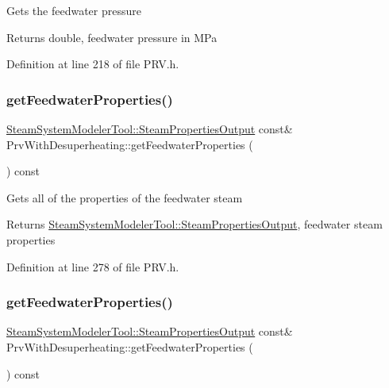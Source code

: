 Gets the feedwater pressure

\begin{DoxyReturn}{Returns}
double, feedwater pressure in M\+Pa 
\end{DoxyReturn}


Definition at line 218 of file P\+R\+V.\+h.

\mbox{\label{class_prv_with_desuperheating_a8f4594109bda9bc4030c23cee9841fa8}} 
\subsubsection{\texorpdfstring{get\+Feedwater\+Properties()}{getFeedwaterProperties()}\hspace{0.1cm}{\footnotesize\ttfamily [1/3]}}
{\footnotesize\ttfamily \hyperlink{struct_steam_system_modeler_tool_1_1_steam_properties_output}{Steam\+System\+Modeler\+Tool\+::\+Steam\+Properties\+Output} const\& Prv\+With\+Desuperheating\+::get\+Feedwater\+Properties (\begin{DoxyParamCaption}{ }\end{DoxyParamCaption}) const\hspace{0.3cm}{\ttfamily [inline]}}

Gets all of the properties of the feedwater steam \begin{DoxyReturn}{Returns}
\hyperlink{struct_steam_system_modeler_tool_1_1_steam_properties_output}{Steam\+System\+Modeler\+Tool\+::\+Steam\+Properties\+Output}, feedwater steam properties 
\end{DoxyReturn}


Definition at line 278 of file P\+R\+V.\+h.

\mbox{\label{class_prv_with_desuperheating_a8f4594109bda9bc4030c23cee9841fa8}} 
\subsubsection{\texorpdfstring{get\+Feedwater\+Properties()}{getFeedwaterProperties()}\hspace{0.1cm}{\footnotesize\ttfamily [2/3]}}
{\footnotesize\ttfamily \hyperlink{struct_steam_system_modeler_tool_1_1_steam_properties_output}{Steam\+System\+Modeler\+Tool\+::\+Steam\+Properties\+Output} const\& Prv\+With\+Desuperheating\+::get\+Feedwater\+Properties (\begin{DoxyParamCaption}{ }\end{DoxyParamCaption}) const\hspace{0.3cm}{\ttfamily [inline]}}

